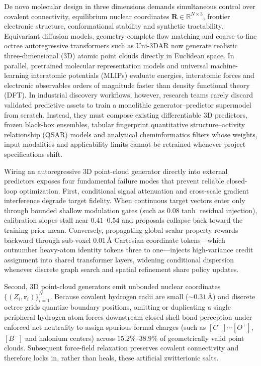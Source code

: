 \documentclass[11pt,a4paper]{article}
\begin{document}
De novo molecular design in three dimensions demands simultaneous control over covalent connectivity, equilibrium nuclear coordinates $\mathbf{R}\in\mathbb{R}^{N\times 3}$, frontier electronic structure\cite{stuke2020oe62,bhat2023ocelot,zhao2026o2gen}, conformational stability and synthetic tractability\cite{ertl2009sa,bickerton2012qed}. Equivariant diffusion models\cite{hoogeboom2022edm,xu2023geoldm}, geometry-complete flow matching\cite{zeng2026propmolflow} and coarse-to-fine octree autoregressive transformers such as Uni-3DAR\cite{lu2025uni3dar} now generate realistic three-dimensional (3D) atomic point clouds directly in Euclidean space. In parallel, pretrained molecular representation models\cite{ji2024unimol2,zhou2023unimol} and universal machine-learning interatomic potentials (MLIPs)\cite{deepmodeling2026dpa4,hyra2026hyff} evaluate energies, interatomic forces and electronic observables orders of magnitude faster than density functional theory (DFT). In industrial discovery workflows, however, research teams rarely discard validated predictive assets to train a monolithic generator--predictor supermodel from scratch. Instead, they must compose existing differentiable 3D predictors, frozen black-box ensembles, tabular fingerprint quantitative structure--activity relationship (QSAR) models and analytical cheminformatics filters whose weights, input modalities and applicability limits cannot be retrained whenever project specifications shift.

Wiring an autoregressive 3D point-cloud generator directly into external predictors exposes four fundamental failure modes that prevent reliable closed-loop optimization. First, conditional signal attenuation and cross-scale gradient interference degrade target fidelity. When continuous target vectors enter only through bounded shallow modulation gates (such as $0.08\tanh$ residual injection), calibration slopes stall near $0.41$--$0.54$ and proposals collapse back toward the training prior mean. Conversely, propagating global scalar property rewards backward through sub-voxel $0.01\,\text{\AA}$ Cartesian coordinate tokens---which outnumber heavy-atom identity tokens three to one---injects high-variance credit assignment into shared transformer layers, widening conditional dispersion whenever discrete graph search and spatial refinement share policy updates.

Second, 3D point-cloud generators emit unbonded nuclear coordinates $\{(Z_i,\mathbf{r}_i)\}_{i=1}^N$. Because covalent hydrogen radii are small ($\sim 0.31\,\text{\AA}$) and discrete octree grids quantize boundary positions, omitting or duplicating a single peripheral hydrogen atom forces downstream closed-shell bond perception\cite{rdkit2026bonds} under enforced net neutrality to assign spurious formal charges (such as $[C^{-}]\cdots[O^{+}]$, $[B^{-}]$ and halonium centers) across $15.2\%$--$38.9\%$ of geometrically valid point clouds. Subsequent force-field relaxation preserves covalent connectivity and therefore locks in, rather than heals, these artificial zwitterionic salts.
\end{document}
